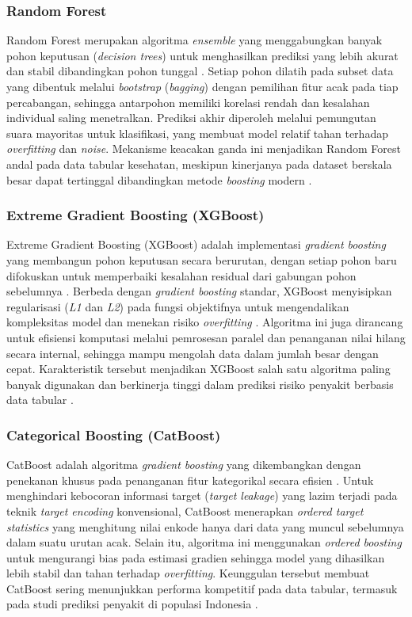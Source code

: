 \subsubsection{Random Forest}
Random Forest merupakan algoritma \emph{ensemble} yang menggabungkan banyak pohon keputusan (\emph{decision trees}) untuk menghasilkan prediksi yang lebih akurat dan stabil dibandingkan pohon tunggal \autocite{Breiman2001RandomForests}. Setiap pohon dilatih pada subset data yang dibentuk melalui \emph{bootstrap} (\emph{bagging}) dengan pemilihan fitur acak pada tiap percabangan, sehingga antarpohon memiliki korelasi rendah dan kesalahan individual saling menetralkan. Prediksi akhir diperoleh melalui pemungutan suara mayoritas untuk klasifikasi, yang membuat model relatif tahan terhadap \emph{overfitting} dan \emph{noise}. Mekanisme keacakan ganda ini menjadikan Random Forest andal pada data tabular kesehatan, meskipun kinerjanya pada dataset berskala besar dapat tertinggal dibandingkan metode \emph{boosting} modern \autocite{S2024Impact}.

\subsubsection{Extreme Gradient Boosting (XGBoost)}
Extreme Gradient Boosting (XGBoost) adalah implementasi \emph{gradient boosting} yang membangun pohon keputusan secara berurutan, dengan setiap pohon baru difokuskan untuk memperbaiki kesalahan residual dari gabungan pohon sebelumnya \autocite{Chen2016XGBoost}. Berbeda dengan \emph{gradient boosting} standar, XGBoost menyisipkan regularisasi (\emph{L1} dan \emph{L2}) pada fungsi objektifnya untuk mengendalikan kompleksitas model dan menekan risiko \emph{overfitting} \autocite{Chen2016XGBoost}. Algoritma ini juga dirancang untuk efisiensi komputasi melalui pemrosesan paralel dan penanganan nilai hilang secara internal, sehingga mampu mengolah data dalam jumlah besar dengan cepat. Karakteristik tersebut menjadikan XGBoost salah satu algoritma paling banyak digunakan dan berkinerja tinggi dalam prediksi risiko penyakit berbasis data tabular \autocite{Li2025XGBoost}.

\subsubsection{Categorical Boosting (CatBoost)}
CatBoost adalah algoritma \emph{gradient boosting} yang dikembangkan dengan penekanan khusus pada penanganan fitur kategorikal secara efisien \autocite{Prokhorenkova2018CatBoost}. Untuk menghindari kebocoran informasi target (\emph{target leakage}) yang lazim terjadi pada teknik \emph{target encoding} konvensional, CatBoost menerapkan \emph{ordered target statistics} yang menghitung nilai enkode hanya dari data yang muncul sebelumnya dalam suatu urutan acak. Selain itu, algoritma ini menggunakan \emph{ordered boosting} untuk mengurangi bias pada estimasi gradien sehingga model yang dihasilkan lebih stabil dan tahan terhadap \emph{overfitting}. Keunggulan tersebut membuat CatBoost sering menunjukkan performa kompetitif pada data tabular, termasuk pada studi prediksi penyakit di populasi Indonesia \autocite{Septian2025Prediction}.

